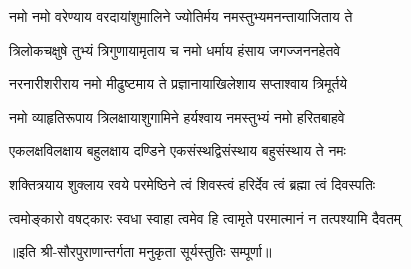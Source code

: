 

\twolineshloka
{नमो नमो वरेण्याय वरदायांशुमालिने}
{ज्योतिर्मय नमस्तुभ्यमनन्तायाजिताय ते}

\twolineshloka
{त्रिलोकचक्षुषे तुभ्यं त्रिगुणायामृताय च}
{नमो धर्माय हंसाय जगज्जननहेतवे}

\twolineshloka
{नरनारीशरीराय नमो मीढुष्टमाय ते}
{प्रज्ञानायाखिलेशाय सप्ताश्वाय त्रिमूर्तये}

\twolineshloka
{नमो व्याहृतिरूपाय त्रिलक्षायाशुगामिने}
{हर्यश्वाय नमस्तुभ्यं नमो हरितबाहवे}

\twolineshloka
{एकलक्षविलक्षाय बहुलक्षाय दण्डिने}
{एकसंस्थद्विसंस्थाय बहुसंस्थाय ते नमः}

\twolineshloka
{शक्तित्रयाय शुक्लाय रवये परमेष्ठिने}
{त्वं शिवस्त्वं हरिर्देव त्वं ब्रह्मा त्वं दिवस्पतिः}

\twolineshloka
{त्वमोङ्कारो वषट्कारः स्वधा स्वाहा त्वमेव हि}
{त्वामृते परमात्मानं न तत्पश्यामि दैवतम्}


॥इति श्री-सौरपुराणान्तर्गता मनुकृता सूर्यस्तुतिः सम्पूर्णा॥